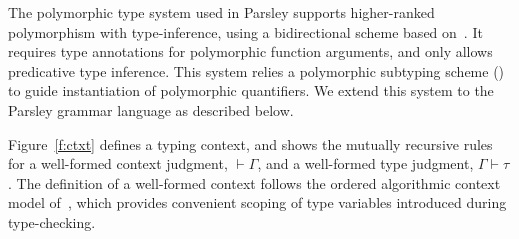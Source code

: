 \documentclass[letterpaper]{article}
\begin{document}
The polymorphic type system used in Parsley supports higher-ranked
polymorphism with type-inference, using a bidirectional scheme based
on~\cite{Dunfield13:bidir}.  It requires type annotations for
polymorphic function arguments, and only allows predicative type
inference.  This system relies a polymorphic subtyping scheme
(\cite{odersky96}) to guide instantiation of polymorphic quantifiers.
We extend this system to the Parsley grammar language as described
below.

Figure~\ref{f:ctxt} defines a typing context, and shows the mutually
recursive rules for a well-formed context judgment, $\vdash\Gamma$,
and a well-formed type judgment, $\Gamma\vdash\tau$.  The definition
of a well-formed context follows the ordered algorithmic context model
of~\cite{zhao2018,zhao19:bidir,Dunfield13:bidir}, which provides
convenient scoping of type variables introduced during type-checking.
\end{document}
